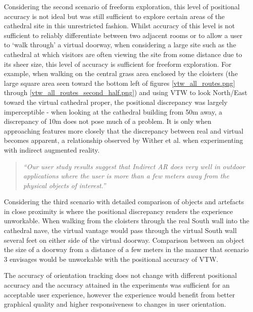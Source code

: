 Considering the second scenario of freeform exploration, this level of positional accuracy is not ideal but was still sufficient to explore certain areas of the cathedral site in this unrestricted fashion. Whilst accuracy of this level is not sufficient to reliably differentiate between two adjacent rooms or to allow a user to `walk through' a virtual doorway, when considering a large site such as the cathedral at which visitors are often viewing the site from some distance due to its sheer size, this level of accuracy is sufficient for freeform exploration. For example, when walking on the central grass area enclosed by the cloisters (the large square area seen toward the bottom left of figures \ref{vtw_all_routes.png} through \ref{vtw_all_routes_second_half.png}) and using VTW to look North/East toward the virtual cathedral proper, the positional discrepancy was largely imperceptible - when looking at the cathedral building from 50m away, a discrepancy of 10m does not pose much of a problem. It is only when approaching features more closely that the discrepancy between real and virtual becomes apparent, a relationship observed by Wither et al. when experimenting with indirect augmented reality.

\begin{quote}
	\textit{``Our user study results suggest that Indirect AR does very well in outdoor applications where the user is more than a few meters away from the physical objects of interest.''}~\cite{Wither2011}
\end{quote}

Considering the third scenario with detailed comparison of objects and artefacts in close proximity is where the positional discrepancy renders the experience unworkable. When walking from the cloisters through the real South wall into the cathedral nave, the virtual vantage would pass through the virtual South wall several feet on either side of the virtual doorway. Comparison between an object the size of a doorway from a distance of a few meters in the manner that scenario 3 envisages would be unworkable with the positional accuracy of VTW.

The accuracy of orientation tracking does not change with different positional accuracy and the accuracy attained in the experiments was sufficient for an acceptable user experience, however the experience would benefit from better graphical quality and higher responsiveness to changes in user orientation.


